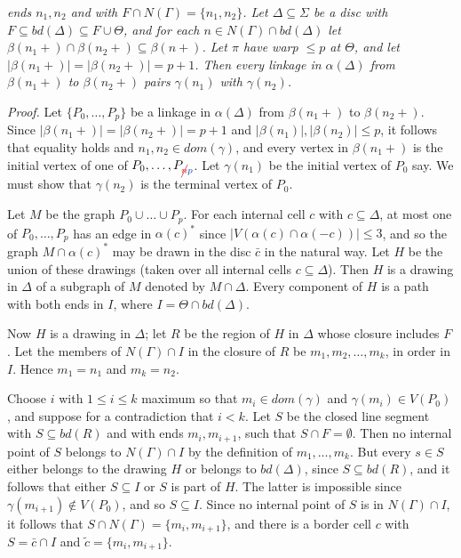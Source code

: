 \noindent \textit{ends $n_1, n_2$ and with $F \cap N(\Gamma) = \{n_1, n_2\}$. Let $\Delta \subseteq \Sigma$ be a disc with $F \subseteq bd(\Delta) \subseteq F \cup \Theta$, and for each $n \in N(\Gamma) \cap bd(\Delta)$ let $\beta(n_1+) \cap \beta(n_2+) \subseteq \beta(n+)$. Let $\pi$ have warp $\le p$ at $\Theta$, and let $|\beta(n_1+)| = |\beta(n_2+)| = p+1$. Then every linkage in $\alpha(\Delta)$ from $\beta(n_1+)$ to $\beta(n_2+)$ pairs $\gamma(n_1)$ with $\gamma(n_2)$.}

\textit{Proof.} Let $\{P_0, \dots, P_p\}$ be a linkage in $\alpha(\Delta)$ from $\beta(n_1+)$ to $\beta(n_2+)$. Since $|\beta(n_1+)| = |\beta(n_2+)| = p+1$ and $|\beta(n_1)|, |\beta(n_2)| \le p$, it follows that equality holds and $n_1, n_2 \in dom(\gamma)$, and every vertex in $\beta(n_1+)$ is the initial vertex of one of $P_0, \dots, P_{\delm{n}\fix{p}}$. Let $\gamma(n_1)$ be the initial vertex of $P_0$ say. We must show that $\gamma(n_2)$ is the terminal vertex of $P_0$.

Let $M$ be the graph $P_0 \cup \dots \cup P_p$. For each internal cell $c$ with $c \subseteq \Delta$, at most one of $P_0, \dots, P_p$ has an edge in $\alpha(c)^*$ since $|V(\alpha(c) \cap \alpha(-c))| \le 3$, and so the graph $M \cap \alpha(c)^*$ may be drawn in the disc $\bar{c}$ in the natural way. Let $H$ be the union of these drawings (taken over all internal cells $c \subseteq \Delta$). Then $H$ is a drawing in $\Delta$ of a subgraph of $M$ denoted by $M \cap \Delta$. Every component of $H$ is a path with both ends in $I$, where $I = \Theta \cap bd(\Delta)$.

Now $H$ is a drawing in $\Delta$; let $R$ be the region of $H$ in $\Delta$ whose closure includes $F$. Let the members of $N(\Gamma) \cap I$ in the closure of $R$ be $m_1, m_2, \dots, m_k$, in order in $I$. Hence $m_1 = n_1$ and $m_k = n_2$.

Choose $i$ with $1 \le i \le k$ maximum so that $m_i \in dom(\gamma)$ and $\gamma(m_i) \in V(P_0)$, and suppose for a contradiction that $i < k$. Let $S$ be the closed line segment with $S \subseteq bd(R)$ and with ends $m_i, m_{i+1}$, such that $S \cap F = \emptyset$. Then no internal point of $S$ belongs to $N(\Gamma) \cap I$ by the definition of $m_1, \dots, m_k$. But every $s \in S$ either belongs to the drawing $H$ or belongs to $bd(\Delta)$, since $S \subseteq bd(R)$, and it follows that either $S \subseteq I$ or $S$ is part of $H$. The latter is impossible since $\gamma(m_{i+1}) \notin V(P_0)$, and so $S \subseteq I$. Since no internal point of $S$ is in $N(\Gamma) \cap I$, it follows that $S \cap N(\Gamma) = \{m_i, m_{i+1}\}$, and there is a border cell $c$ with $S = \bar{c} \cap I$ and $\tilde{c} = \{m_i, m_{i+1}\}$.

